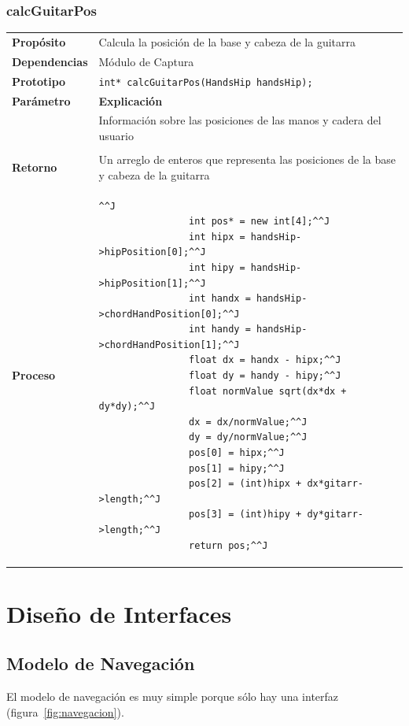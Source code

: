 \documentclass[a4paper,10pt]{article}
\begin{document}
\subsubsection{calcGuitarPos}
\begin{tabularx}{\textwidth}{p{25mm} X}
        \textbf{Propósito} & Calcula la posición de la base y cabeza de la guitarra\\
        \textbf{Dependencias} & Módulo de Captura \\
        \textbf{Prototipo} & \lstinline{int* calcGuitarPos(HandsHip handsHip);}\\
        \textbf{Parámetro} & \textbf{Explicación} \\
        \begin{tabular}{p{2cm} l}
                handsHip & Información sobre las posiciones de las manos y cadera del usuario \\
        \end{tabular}\\

        \textbf{Retorno} & Un arreglo de enteros que representa las posiciones de la base y cabeza de la guitarra\\
        \textbf{Proceso} & 
        \begin{lstlisting}[breaklines=true]^^J
                int pos* = new int[4];^^J
                int hipx = handsHip->hipPosition[0];^^J
                int hipy = handsHip->hipPosition[1];^^J
                int handx = handsHip->chordHandPosition[0];^^J
                int handy = handsHip->chordHandPosition[1];^^J
                float dx = handx - hipx;^^J
                float dy = handy - hipy;^^J
                float normValue sqrt(dx*dx + dy*dy);^^J
                dx = dx/normValue;^^J
                dy = dy/normValue;^^J
                pos[0] = hipx;^^J
                pos[1] = hipy;^^J
                pos[2] = (int)hipx + dx*gitarr->length;^^J
                pos[3] = (int)hipy + dy*gitarr->length;^^J
                return pos;^^J
        \end{lstlisting}

\end{tabularx}
\section{Diseño de Interfaces}
\subsection{Modelo de Navegación}
El modelo de navegación es muy simple porque sólo hay una interfaz
(figura~\ref{fig:navegacion}).
\end{document}
